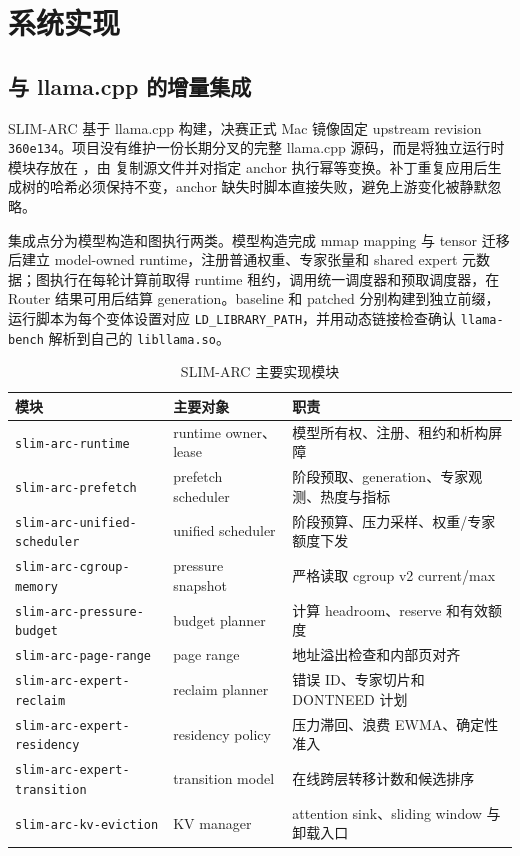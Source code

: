 \section{系统实现}
\label{sec:implementation}

\subsection{与 llama.cpp 的增量集成}

SLIM-ARC 基于 llama.cpp 构建，决赛正式 Mac 镜像固定 upstream revision \texttt{360e134}。项目没有维护一份长期分叉的完整 llama.cpp 源码，而是将独立运行时模块存放在 ，由  复制源文件并对指定 anchor 执行幂等变换。补丁重复应用后生成树的哈希必须保持不变，anchor 缺失时脚本直接失败，避免上游变化被静默忽略。

集成点分为模型构造和图执行两类。模型构造完成 mmap mapping 与 tensor 迁移后建立 model-owned runtime，注册普通权重、专家张量和 shared expert 元数据；图执行在每轮计算前取得 runtime 租约，调用统一调度器和预取调度器，在 Router 结果可用后结算 generation。baseline 和 patched 分别构建到独立前缀，运行脚本为每个变体设置对应 \texttt{LD\_LIBRARY\_PATH}，并用动态链接检查确认 \texttt{llama-bench} 解析到自己的 \texttt{libllama.so}。

\begin{table}[H]
  \centering
  \scriptsize
  \caption{SLIM-ARC 主要实现模块}
  \label{tab:implementation-modules}
  \begin{tabular}{p{}p{}p{}}
    \toprule
    模块 & 主要对象 & 职责 \\
    \midrule
    \texttt{slim-arc-runtime} & runtime owner、lease & 模型所有权、注册、租约和析构屏障 \\
    \texttt{slim-arc-prefetch} & prefetch scheduler & 阶段预取、generation、专家观测、热度与指标 \\
    \texttt{slim-arc-unified-scheduler} & unified scheduler & 阶段预算、压力采样、权重/专家额度下发 \\
    \texttt{slim-arc-cgroup-memory} & pressure snapshot & 严格读取 cgroup v2 current/max \\
    \texttt{slim-arc-pressure-budget} & budget planner & 计算 headroom、reserve 和有效额度 \\
    \texttt{slim-arc-page-range} & page range & 地址溢出检查和内部页对齐 \\
    \texttt{slim-arc-expert-reclaim} & reclaim planner & 错误 ID、专家切片和 DONTNEED 计划 \\
    \texttt{slim-arc-expert-residency} & residency policy & 压力滞回、浪费 EWMA、确定性准入 \\
    \texttt{slim-arc-expert-transition} & transition model & 在线跨层转移计数和候选排序 \\
    \texttt{slim-arc-kv-eviction} & KV manager & attention sink、sliding window 与卸载入口 \\
    \bottomrule
  \end{tabular}
\end{table}

